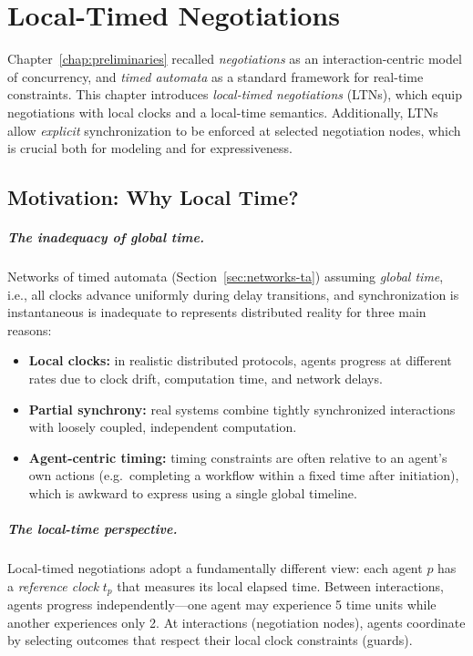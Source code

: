 
\chapter{Local-Timed Negotiations}
\label{chap:ltn}

Chapter~\ref{chap:preliminaries} recalled \emph{negotiations} as an
interaction-centric model of concurrency, and \emph{timed automata} as a standard
framework for real-time constraints.  This chapter introduces
\emph{local-timed negotiations} (LTNs), which equip negotiations with local clocks
and a local-time semantics.  Additionally, LTNs allow \emph{explicit}
synchronization to be enforced at selected negotiation nodes, which is crucial
both for modeling and for expressiveness.

\section{Motivation: Why Local Time?}

\paragraph{The inadequacy of global time.} Networks of timed automata (Section~\ref{sec:networks-ta}) assuming \emph{global time}, i.e., all clocks advance uniformly during delay transitions, and synchronization is instantaneous is inadequate to represents distributed reality for three main reasons:

\begin{itemize}
  \item \textbf{Local clocks:} in realistic distributed protocols, agents progress
        at different rates due to clock drift, computation time, and network
        delays.
  \item \textbf{Partial synchrony:} real systems combine tightly synchronized
        interactions with loosely coupled, independent computation.
  \item \textbf{Agent-centric timing:} timing constraints are often relative to an
        agent’s own actions (e.g.\ completing a workflow within a fixed time after
        initiation), which is awkward to express using a single global timeline.
\end{itemize}

\paragraph{The local-time perspective.} Local-timed negotiations adopt a fundamentally different view: each agent $p$ has a \emph{reference clock} $t_p$ that measures its local elapsed time. Between interactions, agents progress independently—one agent may experience 5 time units while another experiences only 2. At interactions (negotiation nodes), agents coordinate by selecting outcomes that respect their local clock constraints (guards). 


